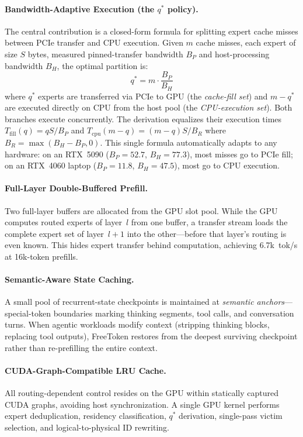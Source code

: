 \documentclass[11pt,a4paper]{article}
\begin{document}
\paragraph{Bandwidth-Adaptive Execution (the $q^*$ policy).} The central contribution is a closed-form formula for splitting expert cache misses between PCIe transfer and CPU execution. Given $m$ cache misses, each expert of size $S$ bytes, measured pinned-transfer bandwidth $B_P$ and host-processing bandwidth $B_H$, the optimal partition is:
\begin{equation}
q^* = m \cdot \frac{B_P}{B_H}
\end{equation}
where $q^*$ experts are transferred via PCIe to GPU (the \emph{cache-fill set}) and $m - q^*$ are executed directly on CPU from the host pool (the \emph{CPU-execution set}). Both branches execute concurrently. The derivation equalizes their execution times $T_{\text{fill}}(q) = qS/B_P$ and $T_{\text{cpu}}(m-q) = (m-q)S/B_R$ where $B_R = \max(B_H - B_P, 0)$. This single formula automatically adapts to any hardware: on an RTX~5090 ($B_P{=}52.7$, $B_H{=}77.3$), most misses go to PCIe fill; on an RTX~4060 laptop ($B_P{=}11.8$, $B_H{=}47.5$), most go to CPU execution.

\paragraph{Full-Layer Double-Buffered Prefill.} Two full-layer buffers are allocated from the GPU slot pool. While the GPU computes routed experts of layer~$l$ from one buffer, a transfer stream loads the complete expert set of layer~$l{+}1$ into the other---before that layer's routing is even known. This hides expert transfer behind computation, achieving 6.7k~tok/s at 16k-token prefills.

\paragraph{Semantic-Aware State Caching.} A small pool of recurrent-state checkpoints is maintained at \emph{semantic anchors}---special-token boundaries marking thinking segments, tool calls, and conversation turns. When agentic workloads modify context (stripping thinking blocks, replacing tool outputs), FreeToken restores from the deepest surviving checkpoint rather than re-prefilling the entire context.

\paragraph{CUDA-Graph-Compatible LRU Cache.} All routing-dependent control resides on the GPU within statically captured CUDA graphs, avoiding host synchronization. A single GPU kernel performs expert deduplication, residency classification, $q^*$ derivation, single-pass victim selection, and logical-to-physical ID rewriting.
\end{document}
